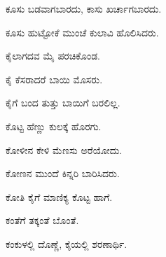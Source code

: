 \noindent\hspace*{0.6em}\kbvbullet\hspace{0.55em}ಕೂಸು ಬಡವಾಗಬಾರದು, ಕಾಸು ಖರ್ಚಾಗಬಾರದು.\par

\noindent\hspace*{0.6em}\kbvbullet\hspace{0.55em}ಕೂಸು ಹುಟ್ಟೋಕೆ ಮುಂಚೆ ಕುಲಾವಿ ಹೊಲಿಸಿದರು.\par

\noindent\hspace*{0.6em}\kbvbullet\hspace{0.55em}ಕೈಲಾಗದವ ಮೈ ಪರಚಿಕೊಂಡ.\par

\noindent\hspace*{0.6em}\kbvbullet\hspace{0.55em}ಕೈ ಕೆಸರಾದರೆ ಬಾಯಿ ಮೊಸರು.\par

\noindent\hspace*{0.6em}\kbvbullet\hspace{0.55em}ಕೈಗೆ ಬಂದ ತುತ್ತು ಬಾಯಿಗೆ ಬರಲಿಲ್ಲ.\par

\noindent\hspace*{0.6em}\kbvbullet\hspace{0.55em}ಕೊಟ್ಟ ಹೆಣ್ಣು ಕುಲಕ್ಕೆ ಹೊರಗು.\par

\noindent\hspace*{0.6em}\kbvbullet\hspace{0.55em}ಕೋಳೀನ ಕೇಳಿ ಮೆಣಸು ಅರೆಯೋದು.\par

\noindent\hspace*{0.6em}\kbvbullet\hspace{0.55em}ಕೋಣನ ಮುಂದೆ ಕಿನ್ನರಿ ಬಾರಿಸಿದರು.\par

\noindent\hspace*{0.6em}\kbvbullet\hspace{0.55em}ಕೋತಿ ಕೈಗೆ ಮಾಣಿಕ್ಯ ಕೊಟ್ಟ ಹಾಗೆ.\par

\noindent\hspace*{0.6em}\kbvbullet\hspace{0.55em}ಕಂತೆಗೆ ತಕ್ಕಂತೆ ಬೊಂತೆ.\par

\noindent\hspace*{0.6em}\kbvbullet\hspace{0.55em}ಕಂಕುಳಲ್ಲಿ ದೊಣ್ಣೆ, ಕೈಯಲ್ಲಿ ಶರಣಾರ್ಥಿ.\par

